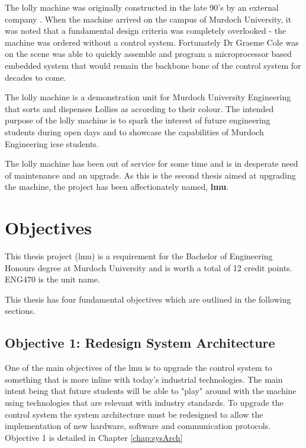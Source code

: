 The lolly machine was originally constructed in the late 90's by an external company \cite{computerControlGCole}. When the machine arrived on the campus of Murdoch University, it was noted that a fundamental design criteria was completely overlooked - the machine was ordered without a control system. Fortunately Dr Graeme Cole was on the scene was able to quickly assemble and program a microprocessor based embedded system that would remain the backbone bone of the control system for decades to come. 

The lolly machine is a demonstration unit for Murdoch University Engineering that sorts and dispenses Lollies as according to their colour. The intended purpose of the lolly machine is to spark the interest of future engineering students during open days and to showcase the capabilities of Murdoch Engineering \acrlong{icse} students.

The lolly machine has been out of service for some time and is in desperate need of maintenance and an upgrade. As this is the second thesis aimed at upgrading the machine, the project has been affectionately named, \textbf{\acrfull{lmu}}.

\section{Objectives}
   This thesis project (\acrfull{lmu}) is a requirement for the Bachelor of Engineering Honours degree at Murdoch University and is worth a total of 12 credit points. ENG470 is the unit name.
   
   This thesis  has four fundamental objectives which are outlined in the following sections.
   
    
    \subsection{Objective 1: Redesign System Architecture}
        One of the main objectives of the \acrshort{lmu} is to upgrade the control system to something that is more inline with today's industrial technologies. The main intent being that future students will be able to  "play" around with the machine using technologies that are relevant with industry standards. To upgrade the control system the system architecture must be redesigned to allow the implementation of new hardware, software and communication protocols. Objective 1 is detailed in Chapter \ref{chap:sysArch}
        
